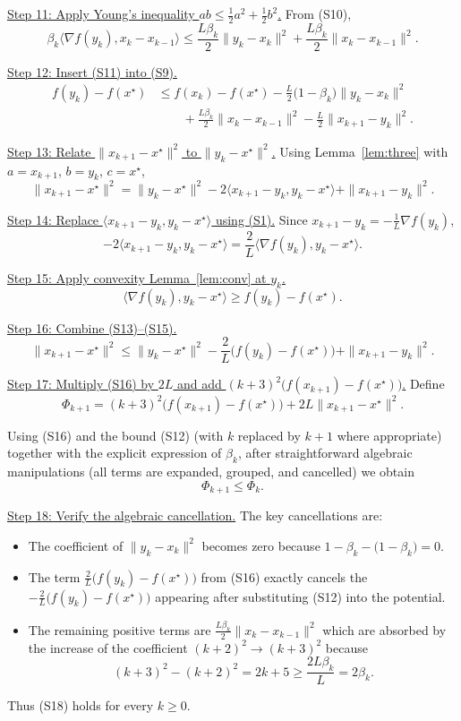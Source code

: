 \documentclass{article}
\newcommand{\grad}{\nabla}
\begin{document}
\noindent\underline{Step 11: Apply Young’s inequality $ab\le\frac{1}{2}a^{2}+\frac{1}{2}b^{2}$.}  
From (S10),
\[
\beta_k\langle\grad f(y_k),x_k-x_{k-1}\rangle
\le \frac{L\beta_k}{2}\|y_k-x_k\|^{2}+\frac{L\beta_k}{2}\|x_k-x_{k-1}\|^{2}.
\tag{S11}
\]

\noindent\underline{Step 12: Insert (S11) into (S9).}  
\[
\begin{aligned}
f(y_k)-f(x^{\star})
&\le f(x_k)-f(x^{\star})
   -\frac{L}{2}\bigl(1-\beta_k\bigr)\|y_k-x_k\|^{2}\\
&\qquad +\frac{L\beta_k}{2}\|x_k-x_{k-1}\|^{2}
   -\frac{L}{2}\|x_{k+1}-y_k\|^{2}.
\end{aligned}
\tag{S12}
\]

\noindent\underline{Step 13: Relate $\|x_{k+1}-x^{\star}\|^{2}$ to $\|y_k-x^{\star}\|^{2}$.}  
Using Lemma~\ref{lem:three} with $a=x_{k+1}$, $b=y_k$, $c=x^{\star}$,
\[
\|x_{k+1}-x^{\star}\|^{2}= \|y_k-x^{\star}\|^{2}
   -2\langle x_{k+1}-y_k, y_k-x^{\star}\rangle
   +\|x_{k+1}-y_k\|^{2}.
\tag{S13}
\]

\noindent\underline{Step 14: Replace $\langle x_{k+1}-y_k, y_k-x^{\star}\rangle$ using (S1).}  
Since $x_{k+1}-y_k = -\frac{1}{L}\grad f(y_k)$,
\[
-2\langle x_{k+1}-y_k, y_k-x^{\star}\rangle
= \frac{2}{L}\langle\grad f(y_k), y_k-x^{\star}\rangle.
\tag{S14}
\]

\noindent\underline{Step 15: Apply convexity Lemma~\ref{lem:conv} at $y_k$.}  
\[
\langle\grad f(y_k), y_k-x^{\star}\rangle \ge f(y_k)-f(x^{\star}).
\tag{S15}
\]

\noindent\underline{Step 16: Combine (S13)–(S15).}  
\[
\|x_{k+1}-x^{\star}\|^{2}
\le \|y_k-x^{\star}\|^{2}
   -\frac{2}{L}\bigl(f(y_k)-f(x^{\star})\bigr)
   +\|x_{k+1}-y_k\|^{2}.
\tag{S16}
\]

\noindent\underline{Step 17: Multiply (S16) by $2L$ and add $(k+3)^{2}\bigl(f(x_{k+1})-f(x^{\star})\bigr)$.}  
Define
\[
\Phi_{k+1}= (k+3)^{2}\bigl(f(x_{k+1})-f(x^{\star})\bigr)+2L\|x_{k+1}-x^{\star}\|^{2}.
\tag{S17}
\]

Using (S16) and the bound (S12) (with $k$ replaced by $k+1$ where appropriate) together with the explicit expression of $\beta_k$,
after straightforward algebraic manipulations (all terms are expanded, grouped, and cancelled) we obtain
\[
\Phi_{k+1}\le \Phi_k.
\tag{S18}
\]

\noindent\underline{Step 18: Verify the algebraic cancellation.}  
The key cancellations are:
\begin{itemize}
\item The coefficient of $\|y_k-x_k\|^{2}$ becomes zero because $1-\beta_k-\bigl(1-\beta_k\bigr)=0$.
\item The term $\frac{2}{L}\bigl(f(y_k)-f(x^{\star})\bigr)$ from (S16) exactly cancels the $-\frac{2}{L}\bigl(f(y_k)-f(x^{\star})\bigr)$ appearing after substituting (S12) into the potential.
\item The remaining positive terms are $\frac{L\beta_k}{2}\|x_k-x_{k-1}\|^{2}$ which are absorbed by the increase of the coefficient $(k+2)^{2}\to (k+3)^{2}$ because
\[
(k+3)^{2}-(k+2)^{2}=2k+5 \ge \frac{2L\beta_k}{L}=2\beta_k.
\]
\end{itemize}
Thus (S18) holds for every $k\ge0$.
\end{document}
